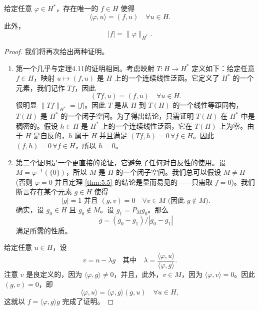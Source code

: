 \begin{theorem}\label{thm:5.5}
给定任意 $\varphi \in H^*$，存在唯一的 $f \in H$ 使得
\[ \langle \varphi, u \rangle = (f, u) \quad \forall u \in H. \]
此外，
\[ |f| = \|\varphi\|_{H^*}. \]
\end{theorem}
\begin{proof}
我们将再次给出两种证明。
\begin{enumerate}
    \item 第一个几乎与定理4.11的证明相同。考虑映射 $T: H \to H^*$ 定义如下：给定任意 $f \in H$，映射 $u \mapsto (f,u)$ 是 $H$ 上的一个连续线性泛函。它定义了 $H^*$ 的一个元素，我们记作 $Tf$，因此
    \[ (Tf, u) = (f, u) \quad \forall u \in H. \]
    很明显 $\|Tf\|_{H^*} = |f|$。因此 $T$ 是从 $H$ 到 $T(H)$ 的一个线性等距同构，$T(H)$ 是 $H^*$ 的一个闭子空间。为了得出结论，只需证明 $T(H)$ 在 $H^*$ 中是稠密的。假设 $h \in H$ 是 $H^*$ 上的一个连续线性泛函，它在 $T(H)$ 上为零。由于 $H$ 是自反的，$h$ 属于 $H$ 并且满足 $(Tf, h) = 0 \, \forall f \in H$。因此 $(f, h) = 0 \, \forall f \in H$，所以 $h=0$。
    \item 第二个证明是一个更直接的论证，它避免了任何对自反性的使用。设 $M = \varphi^{-1}(\{0\})$，所以 $M$ 是 $H$ 的一个闭子空间。我们总可以假设 $M \ne H$ (否则 $\varphi=0$ 并且定理 \ref{thm:5.5} 的结论是显而易见的——只需取 $f=0$)。我们断言存在某个元素 $g \in H$ 使得
    \[ |g|=1 \text{ 并且 } (g,v)=0 \quad \forall v \in M \text{ (因此 } g \notin M). \]
    确实，设 $g_0 \in H$ 且 $g_0 \notin M$。设 $g_1 = P_M g_0$。那么
    \[ g = (g_0 - g_1) / |g_0 - g_1| \]
    满足所需的性质。
\end{enumerate}
给定任意 $u \in H$，设
\[ v = u - \lambda g \quad \text{其中} \quad \lambda = \frac{\langle \varphi, u \rangle}{\langle \varphi, g \rangle}. \]
注意 $v$ 是良定义的，因为 $\langle \varphi, g \rangle \ne 0$，并且，此外，$v \in M$，因为 $\langle \varphi, v \rangle = 0$。因此 $(g,v)=0$，即
\[ \langle \varphi, u \rangle = \langle \varphi, g \rangle (g,u) \quad \forall u \in H, \]
这就以 $f = \langle \varphi, g \rangle g$ 完成了证明。
\end{proof}

